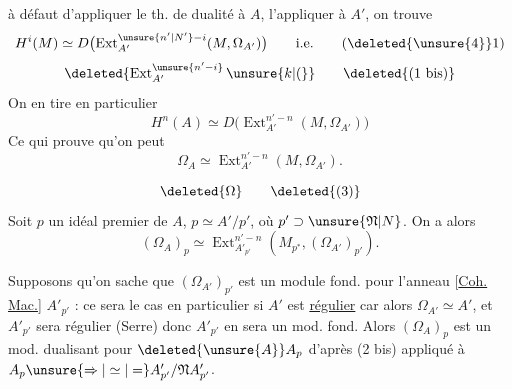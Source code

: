 \begingroup
\makeatletter\tagsleft@true\makeatother
à défaut d'appliquer le th. de dualité à $A$,
l'appliquer à $A'$, on trouve
\[
H^i(M)\simeq D\bigl(\operatorname{Ext}_{A'}^{\unsure{n'|N'}-i}(M,\Omega_{A'})\bigr)\qquad\text{i.e.}\tag*{(\deleted{\unsure{4}}1)}
\]
\[
\deleted{\operatorname{Ext}_{A'}^{\unsure{n'-i}}\unsure{k|(}}\tag*{\deleted{(1 bis)}}
\]
On en tire en particulier
\[
H^n(A)\simeq D\bigl(\operatorname{Ext}_{A'}^{n'-n}(M,\Omega_{A'})\bigr)\tag*{(2)}
\]
Ce qui prouve qu'on peut 
\[
\Omega_A\simeq\operatorname{Ext}_{A'}^{n'-n}(M,\Omega_{A'}).\tag*{(2 bis)}
\]


\[
\deleted{\Omega}\tag*{\deleted{(3)}}
\]
Soit $p$ un idéal premier de
$A$,  $p\simeq A'/p'$, où $p'\supset\unsure{\mathfrak N|N}$. On a
alors
\[
(\Omega_A)_p\simeq\operatorname{Ext}_{A'_{p'}}^{n'-n}
(M_{p^{*}},(\Omega_{A'})_{p'}).
\]

Supposons qu'on sache que $(\Omega_{A'})_{p'}$ est
un module fond. pour l'anneau
[\uline{Coh. Mac.}] $A'_{p'}$ : ce sera le cas en
particulier si $A'$ est \uline{régulier} car alors
$\Omega_{A'}\simeq A'$, et $A'_{p'}$ sera régulier (Serre)
donc $A'_{p'}$ en sera un mod. fond. Alors
$(\Omega_A)_p$ est un mod. dualisant pour $\deleted{\unsure{A}}A_p$
d'après (2 bis) appliqué à $A_p\unsure{\Rightarrow|\simeq|=}A'_{p'}/\mathfrak N A'_{p'}$.
\endgroup

